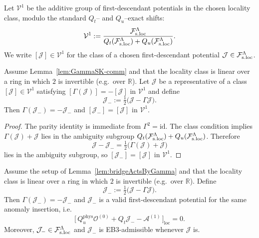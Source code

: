\begin{definition}
\label{def:desc-ambiguity}
Let $\mathcal V^1$ be the additive group of first-descendant potentials in the
chosen locality class, modulo the standard $Q_t$-- and $Q_u$--exact shifts:
\[
\mathcal V^1 :=
\frac{\mathcal F_{\mathrm{s.loc}}^\Lambda}{Q_t(\mathcal F_{\mathrm{s.loc}}^\Lambda) + Q_u(\mathcal F_{\mathrm{s.loc}}^\Lambda)}.
\]
We write $[\mathcal J]\in\mathcal V^1$ for the class of a chosen first-descendant
potential $\mathcal J\in\mathcal F_{\mathrm{s.loc}}^\Lambda$.
\end{definition}

\begin{lemma}
\label{lem:Gamma-odd-rep}
Assume Lemma~\ref{lem:GammaSK-comm} and that the locality class is linear over a
ring in which $2$ is invertible (e.g.\ over $\mathbb R$). Let
$\mathcal J$ be a representative of a class $[\mathcal J]\in\mathcal V^1$
satisfying $[\Gamma(\mathcal J)]=-[\mathcal J]$ in $\mathcal V^1$ and
define
\[
\mathcal J_-:=\tfrac12\big(\mathcal J-\Gamma\mathcal J\big).
\]
Then $\Gamma(\mathcal J_-)=-\mathcal J_-$ and
$[\mathcal J_-]=[\mathcal J]$ in $\mathcal V^1$.
\end{lemma}

\begin{proof}
The parity identity is immediate from $\Gamma^2=\mathrm{id}$. The class
condition implies $\Gamma(\mathcal J)+\mathcal J$ lies in the ambiguity subgroup
$Q_t(\mathcal F_{\mathrm{s.loc}}^\Lambda) + Q_u(\mathcal F_{\mathrm{s.loc}}^\Lambda)$. Therefore
\[
\mathcal J-\mathcal J_-=\tfrac12\big(\Gamma(\mathcal J)+\mathcal J\big)
\]
 lies in the ambiguity subgroup, so $[\mathcal J_-]=[\mathcal J]$ in
 $\mathcal V^1$.
\end{proof}

\begin{lemma}
\label{lem:J-odd-choice}
Assume the setup of Lemma~\ref{lem:bridgeActsByGamma} and that the locality class
is linear over a ring in which $2$ is invertible (e.g.\ over $\mathbb R$).
Define
\[
\mathcal J_-:=\tfrac12\big(\mathcal J-\Gamma\mathcal J\big).
\]
Then $\Gamma(\mathcal J_-)=-\mathcal J_-$ and $\mathcal J_-$ is a valid
first-descendant potential for the same anomaly insertion, i.e.
\[
\big[\,Q_u^{\mathrm{phys}}\mathcal O^{(0)} + Q_t\mathcal J_- - \mathcal A^{(1)}\,\big]_{\mathrm{loc}}=0.
\]
Moreover, $\mathcal J_-\in\mathcal F_{\mathrm{s.loc}}^\Lambda$ and $\mathcal J_-$ is EB3-admissible whenever
$\mathcal J$ is.
\end{lemma}

